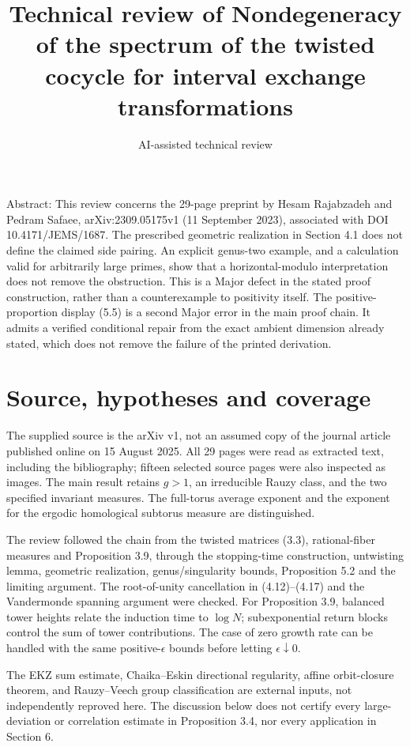\documentclass[10pt]{article}
\title{Technical review of
Nondegeneracy of the spectrum of the twisted cocycle for interval exchange transformations}
\author{AI-assisted technical review}
\date{}
\begin{document}
\maketitle
Abstract: This review concerns the 29-page preprint by Hesam Rajabzadeh and Pedram Safaee, arXiv:2309.05175v1 (11 September 2023), associated with DOI 10.4171/JEMS/1687. The prescribed geometric realization in Section 4.1 does not define the claimed side pairing. An explicit genus-two example, and a calculation valid for arbitrarily large primes, show that a horizontal-modulo interpretation does not remove the obstruction. This is a Major defect in the stated proof construction, rather than a counterexample to positivity itself. The positive-proportion display (5.5) is a second Major error in the main proof chain. It admits a verified conditional repair from the exact ambient dimension already stated, which does not remove the failure of the printed derivation.\par
\section*{Source, hypotheses and coverage}
The supplied source is the arXiv v1, not an assumed copy of the journal article published online on 15 August 2025. All 29 pages were read as extracted text, including the bibliography; fifteen selected source pages were also inspected as images. The main result retains \(g>1\), an irreducible Rauzy class, and the two specified invariant measures. The full-torus average exponent and the exponent for the ergodic homological subtorus measure are distinguished.\par
The review followed the chain from the twisted matrices (3.3), rational-fiber measures and Proposition 3.9, through the stopping-time construction, untwisting lemma, geometric realization, genus/singularity bounds, Proposition 5.2 and the limiting argument. The root-of-unity cancellation in (4.12)–(4.17) and the Vandermonde spanning argument were checked. For Proposition 3.9, balanced tower heights relate the induction time to \(\log N\); subexponential return blocks control the sum of tower contributions. The case of zero growth rate can be handled with the same positive-\(\epsilon\) bounds before letting \(\epsilon\downarrow0\).\par
The EKZ sum estimate, Chaika–Eskin directional regularity, affine orbit-closure theorem, and Rauzy–Veech group classification are external inputs, not independently reproved here. The discussion below does not certify every large-deviation or correlation estimate in Proposition 3.4, nor every application in Section 6.\par
\end{document}
